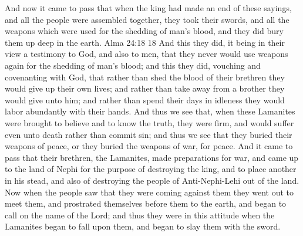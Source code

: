 And now it came to pass that when the king had made an end of these sayings, and all the people were assembled together, they took their swords, and all the weapons which were used for the shedding of man's blood, and they did bury them up deep in the earth.  Alma 24:18 18 And this they did, it being in their view a testimony to God, and also to men, that they never would use weapons again for the shedding of man's blood; and this they did, vouching and covenanting with God, that rather than shed the blood of their brethren they would give up their own lives; and rather than take away from a brother they would give unto him; and rather than spend their days in idleness they would labor abundantly with their hands.
\bverse \iffalse And thus we see that, when these Lamanites were brought to believe and to know the truth, they were firm, and would suffer even unto death rather than commit sin; and thus we see that they buried their weapons of peace, or they buried the weapons of war, for peace. \fi
And thus we see that, when these Lamanites were brought to believe and to know the truth, they were firm, and would suffer even unto death rather than commit sin; and thus we see that they buried their weapons of peace, or they buried the weapons of war, for peace.
\bverse \iffalse And it came to pass that their brethren, the Lamanites, made preparations for war, and came up to the land of Nephi for the purpose of destroying the king, and to place another in his stead, and also of destroying the people of Anti-Nephi-Lehi out of the land. \fi
And it came to pass that their brethren, the Lamanites, made preparations for war, and came up to the land of Nephi for the purpose of destroying the king, and to place another in his stead, and also of destroying the people of Anti-Nephi-Lehi out of the land.
\bverse \iffalse Now when the people saw that they were coming against them they went out to meet them, and prostrated themselves before them to the earth, and began to call on the name of the Lord; and thus they were in this attitude when the Lamanites began to fall upon them, and began to slay them with the sword. \fi
Now when the people saw that they were coming against them they went out to meet them, and prostrated themselves before them to the earth, and began to call on the name of the Lord; and thus they were in this attitude when the Lamanites began to fall upon them, and began to slay them with the sword.
\bverse \iffalse And thus without meeting any resistance, they did slay a thousand and five of them; and we know that they are blessed, for they have gone to dwell with their God. \fi
